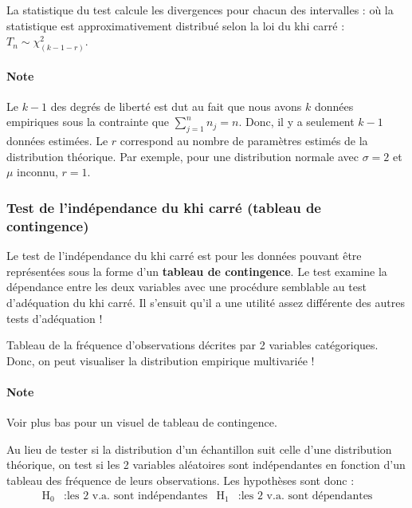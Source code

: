 \documentclass[french]{article}
\begin{document}
\begin{multicols*}{2}
\begin{definitionNOHFILL}
\bigskip

La statistique du test calcule les divergences pour chacun des intervalles :  où la statistique est approximativement distribué selon la loi du khi carré : $T_{n} \sim \chi^{2}_{(k - 1 - r)}$. 

\paragraph{Note}	Le $k - 1$ des degrés de liberté est dut au fait que nous avons $k$ données empiriques sous la contrainte que $\sum_{j = 1}^{n} n_{j} = n$. Donc, il y a seulement $k - 1$ données estimées. Le $r$ correspond au nombre de paramètres estimés de la distribution théorique. Par exemple, pour une distribution normale avec $\sigma = 2$ et $\mu$ inconnu, $r = 1$.

\end{definitionNOHFILL}



\columnbreak
\subsubsection{Test de l'indépendance du khi carré (tableau de contingence)}
\begin{rappel_enhanced}[Motivation]
Le test de l'indépendance du khi carré est pour les données pouvant être représentées sous la forme d'un \textbf{tableau de contingence}. Le test examine la dépendance entre les deux variables avec une procédure semblable au test d'adéquation du khi carré. Il s'ensuit qu'il a une utilité assez différente des autres tests d'adéquation !
\end{rappel_enhanced}

\begin{definitionNOHFILLsub}
Tableau de la fréquence d'observations décrites par 2 variables catégoriques. Donc, on peut visualiser la distribution empirique multivariée ! 

\paragraph{Note}	Voir plus bas pour un visuel de tableau de contingence.
\end{definitionNOHFILLsub}


\begin{definitionNOHFILL}
Au lieu de tester si la distribution d'un échantillon suit celle d'une distribution théorique, on test si les 2 variables aléatoires sont indépendantes en fonction d'un tableau des fréquence de leurs observations. Les hypothèses sont donc : 
\begin{align*}
	\textrm{H}_{0}	&:	\text{les 2 v.a. sont indépendantes}	&
	\textrm{H}_{1}	&:	\text{les 2 v.a. sont dépendantes}
\end{align*}


\end{definitionNOHFILL}
\end{multicols*}
\end{document}
